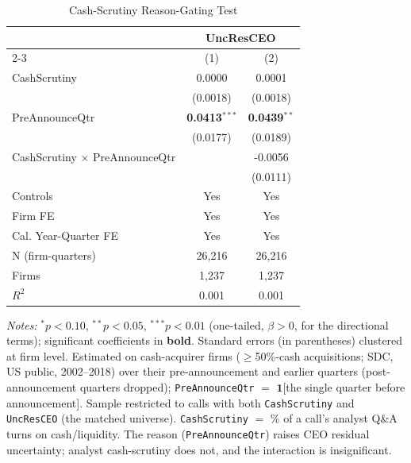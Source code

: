 \begin{table}[htbp]
\centering
\caption{Cash-Scrutiny Reason-Gating Test}
\label{tab:reason_gating}
\small
\begin{tabular}{lcc}
\toprule
 & \multicolumn{2}{c}{UncResCEO} \\
\cmidrule(lr){2-3}
 & (1) & (2) \\
\midrule
CashScrutiny & 0.0000 & 0.0001 \\
 & (0.0018) & (0.0018) \\
PreAnnounceQtr & \textbf{0.0413}$^{***}$ & \textbf{0.0439}$^{**}$ \\
 & (0.0177) & (0.0189) \\
CashScrutiny $\times$ PreAnnounceQtr &  & -0.0056 \\
 &  & (0.0111) \\
\midrule
Controls & Yes & Yes \\
Firm FE & Yes & Yes \\
Cal. Year-Quarter FE & Yes & Yes \\
\midrule
N (firm-quarters) & 26,216 & 26,216 \\
Firms & 1,237 & 1,237 \\
$R^2$ & 0.001 & 0.001 \\
\bottomrule
\end{tabular}
\begin{minipage}{\linewidth}
\vspace{2pt}\scriptsize
\textit{Notes:} $^{*}p<0.10$, $^{**}p<0.05$, $^{***}p<0.01$ (one-tailed, $\beta>0$, for the directional terms); significant coefficients in \textbf{bold}. Standard errors (in parentheses) clustered at firm level. Estimated on cash-acquirer firms ($\geq$50\%-cash acquisitions; SDC, US public, 2002--2018) over their pre-announcement and earlier quarters (post-announcement quarters dropped); \texttt{PreAnnounceQtr} $=$ $\mathbf{1}$[the single quarter before announcement]. Sample restricted to calls with both \texttt{CashScrutiny} and \texttt{UncResCEO} (the matched universe). \texttt{CashScrutiny} $=$ \% of a call's analyst Q\&A turns on cash/liquidity. The reason (\texttt{PreAnnounceQtr}) raises CEO residual uncertainty; analyst cash-scrutiny does not, and the interaction is insignificant.
\end{minipage}
\end{table}
